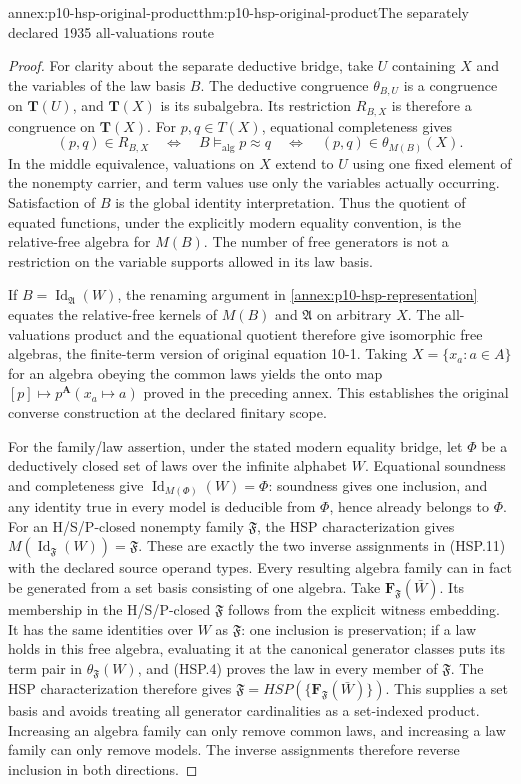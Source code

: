 \begin{annexitem}{annex:p10-hsp-original-product}{thm:p10-hsp-original-product}{The separately declared 1935 all-valuations route}
\begin{proof}
For clarity about the separate deductive bridge,
take \(U\) containing \(X\) and the variables of
the law basis \(B\). The deductive congruence
\(\theta_{B,U}\) is a congruence on
\(\mathbf T(U)\), and \(\mathbf T(X)\)
is its subalgebra. Its restriction \(R_{B,X}\)
is therefore a congruence on \(\mathbf T(X)\).
For \(p,q\in T(X)\), equational completeness gives
\[
 (p,q)\in R_{B,X}
 \quad\Longleftrightarrow\quad
 B\models_{\mathrm{alg}}p\approx q
 \quad\Longleftrightarrow\quad
 (p,q)\in\theta_{M(B)}(X).
 \]
In the middle equivalence, valuations on \(X\)
extend to \(U\) using one fixed element of the
nonempty carrier, and term values use only the
variables actually occurring. Satisfaction of
\(B\) is the global identity interpretation.
Thus the quotient of equated functions, under
the explicitly modern equality convention,
is the relative-free algebra for \(M(B)\).
The number of free generators is not a restriction
on the variable supports allowed in its law basis.

If \(B=\operatorname{Id}_{\mathfrak A}(W)\),
the renaming argument in
\cref{annex:p10-hsp-representation} equates the
relative-free kernels of \(M(B)\) and
\(\mathfrak A\) on arbitrary \(X\).
The all-valuations product and the equational
quotient therefore give isomorphic free algebras,
the finite-term version of original equation 10-1.
Taking \(X=\{x_a:a\in A\}\) for an algebra
obeying the common laws yields the onto map
\([p]\mapsto p^{\mathbf A}(x_a\mapsto a)\)
proved in the preceding annex. This establishes
the original converse construction at the
declared finitary scope.

For the family/law assertion, under the stated modern
equality bridge, let \(\Phi\) be a deductively closed
set of laws over the infinite alphabet \(W\).
Equational soundness and completeness give
\(\operatorname{Id}_{M(\Phi)}(W)=\Phi\):
soundness gives one inclusion, and any identity
true in every model is deducible from \(\Phi\),
hence already belongs to \(\Phi\).
For an H/S/P-closed nonempty family \(\mathfrak F\),
the HSP characterization gives
\(M(\operatorname{Id}_{\mathfrak F}(W))=\mathfrak F\).
These are exactly the two inverse assignments
in (HSP.11) with the declared source operand types.
Every resulting algebra family can in fact be
generated from a set basis consisting of one algebra.
Take \(\mathbf F_{\mathfrak F}(\bar W)\).
Its membership in the H/S/P-closed \(\mathfrak F\)
follows from the explicit witness embedding.
It has the same identities over \(W\) as
\(\mathfrak F\): one inclusion is preservation;
if a law holds in this free algebra, evaluating
it at the canonical generator classes puts its
term pair in \(\theta_{\mathfrak F}(W)\), and
(HSP.4) proves the law in every member of
\(\mathfrak F\). The HSP characterization therefore
gives \(\mathfrak F=HSP(\{\mathbf F_{\mathfrak F}(\bar W)\})\).
This supplies a set basis and avoids treating all
generator cardinalities as a set-indexed product.
Increasing an algebra family can only remove common
laws, and increasing a law family can only remove
models. The inverse assignments therefore reverse
inclusion in both directions.


\end{proof}
\end{annexitem}
